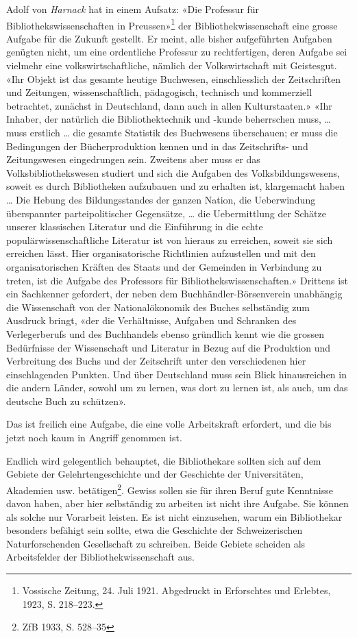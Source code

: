 \documentclass[a4paper,
fontsize=11pt,
oneside,
numbers=noperiodatend,
parskip=half-,
bibliography=totoc,
final
]{scrartcl}
\begin{document}
Adolf von \emph{Harnack} hat in einem Aufsatz: «Die Professur für
Bibliothekswissenschaften in Preussen»\footnote{Vossische Zeitung, 24.
  Juli 1921. Abgedruckt in Erforschtes und Erlebtes, 1923, S. 218--223.}
der Bibliothekwissenschaft eine grosse Aufgabe für die Zukunft gestellt.
Er meint, alle bisher aufgeführten Aufgaben genügten nicht, um eine
ordentliche Professur zu rechtfertigen, deren Aufgabe sei vielmehr eine
volkswirtschaftliche, nämlich der Volkswirtschaft mit Geistesgut. «Ihr
Objekt ist das gesamte heutige Buchwesen, einschliesslich der
Zeitschriften und Zeitungen, wissenschaftlich, pädagogisch, technisch
und kommerziell betrachtet, zunächst in Deutschland, dann auch in allen
Kulturstaaten.» «Ihr Inhaber, der natürlich die Bibliothektechnik und
-kunde beherrschen muss, \ldots{} muss erstlich \ldots{} die gesamte
Statistik des Buchwesens überschauen; er muss die Bedingungen der
Bücherproduktion kennen und in das Zeitschrifts- und Zeitungswesen
eingedrungen sein. Zweitens aber muss er das Volksbibliothekswesen
studiert und sich die Aufgaben des Volksbildungswesens, soweit es durch
Bibliotheken aufzubauen und zu erhalten ist, klargemacht haben \ldots{}
Die Hebung des Bildungsstandes der ganzen Nation, die Ueberwindung
überspannter parteipolitischer Gegensätze, \ldots{} die Uebermittlung
der Schätze unserer klassischen Literatur und die Einführung in die
echte populärwissenschaftliche Literatur ist von hieraus zu erreichen,
soweit sie sich erreichen lässt. Hier organisatorische Richtlinien
aufzustellen und mit den organisatorischen Kräften des Staats und der
Gemeinden in Verbindung zu treten, ist die Aufgabe des Professors für
Bibliothekswissenschaften.» Drittens ist ein Sachkenner gefordert, der
neben dem Buchhändler-Börsenverein unabhängig die Wissenschaft von der
Nationalökonomik des Buches selbständig zum Ausdruck bringt, «der die
Verhältnisse, Aufgaben und Schranken des Verlegerberufs und des
Buchhandels ebenso gründlich kennt wie die grossen Bedürfnisse der
Wissenschaft und Literatur in Bezug auf die Produktion und Verbreitung
des Buchs und der Zeitschrift unter den verschiedenen hier
einschlagenden Punkten. Und über Deutschland muss sein Blick
hinausreichen in die andern Länder, sowohl um zu lernen, was dort zu
lernen ist, als auch, um das deutsche Buch zu schützen».

Das ist freilich eine Aufgabe, die eine volle Arbeitskraft erfordert,
und die bis jetzt noch kaum in Angriff genommen ist.

Endlich wird gelegentlich behauptet, die Bibliothekare sollten sich auf
dem Gebiete der Gelehrtengeschichte und der Geschichte der
Universitäten, Akademien usw. betätigen\footnote{ZfB 1933, S. 528--35}.
Gewiss sollen sie für ihren Beruf gute Kenntnisse davon haben, aber hier
selbständig zu arbeiten ist nicht ihre Aufgabe. Sie können als solche
nur Vorarbeit leisten. Es ist nicht einzusehen, warum ein Bibliothekar
besonders befähigt sein sollte, etwa die Geschichte der Schweizerischen
Naturforschenden Gesellschaft zu schreiben. Beide Gebiete scheiden als
Arbeitsfelder der Bibliothekwissenschaft aus.
\end{document}
